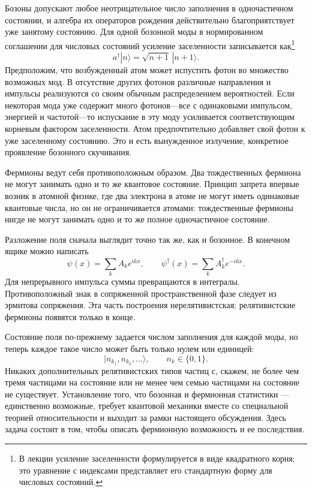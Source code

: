 Бозоны допускают любое неотрицательное число заполнения в одночастичном состоянии, и алгебра их операторов рождения действительно благоприятствует уже занятому состоянию. Для одной бозонной моды в нормированном соглашении для числовых состояний усиление заселенности записывается как\footnote{В лекции усиление заселенности формулируется в виде квадратного корня; это уравнение с индексами представляет его стандартную форму для числовых состояний.}
\begin{equation}
a^\dagger|n\rangle=\sqrt{n+1}\,|n+1\rangle.
\end{equation}
Предположим, что возбужденный атом может испустить фотон во множество возможных мод. В отсутствие других фотонов различные направления и импульсы реализуются со своим обычным распределением вероятностей. Если некоторая мода уже содержит много фотонов---все с одинаковыми импульсом, энергией и частотой---то испускание в эту моду усиливается соответствующим корневым фактором заселенности. Атом предпочтительно добавляет свой фотон к уже заселенному состоянию. Это и есть вынужденное излучение, конкретное проявление бозонного скучивания.

Фермионы ведут себя противоположным образом. Два тождественных фермиона не могут занимать одно и то же квантовое состояние. Принцип запрета впервые возник в атомной физике, где два электрона в атоме не могут иметь одинаковые квантовые числа, но он не ограничивается атомами: тождественные фермионы нигде не могут занимать одно и то же полное одночастичное состояние.

Разложение поля сначала выглядит точно так же, как и бозонное. В конечном ящике можно написать
\begin{equation}
\psi(x)=\sum_k A_k e^{ikx},
\qquad
\psi^\dagger(x)=\sum_k A_k^\dagger e^{-ikx}.
\end{equation}
Для непрерывного импульса суммы превращаются в интегралы. Противоположный знак в сопряженной пространственной фазе следует из эрмитова сопряжения. Эта часть построения нерелятивистская; релятивистские фермионы появятся только в конце.

Состояние поля по-прежнему задается числом заполнения для каждой моды, но теперь каждое такое число может быть только нулем или единицей:
\begin{equation}
|n_{k_1},n_{k_2},\ldots\rangle,
\qquad n_k\in\{0,1\}.
\end{equation}
Никаких дополнительных релятивистских типов частиц с, скажем, не более чем тремя частицами на состояние или не менее чем семью частицами на состояние не существует. Установление того, что бозонная и фермионная статистики — единственно возможные, требует квантовой механики вместе со специальной теорией относительности и выходит за рамки настоящего обсуждения. Здесь задача состоит в том, чтобы описать фермионную возможность и ее последствия.

